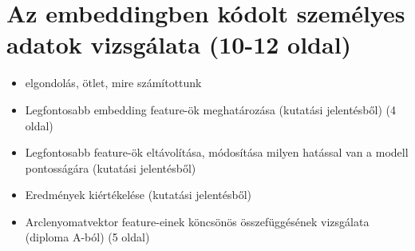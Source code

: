 \section{Az embeddingben kódolt személyes adatok vizsgálata (10-12 oldal)}
\label{sec:5}

\begin{itemize}
	\item elgondolás, ötlet, mire számítottunk
	\item Legfontosabb embedding feature-ök meghatározása (kutatási jelentésből) (4 oldal)
	\item Legfontosabb feature-ök eltávolítása, módosítása milyen hatással van a modell pontosságára (kutatási jelentésből) 
	\item Eredmények kiértékelése (kutatási jelentésből) 
	\item Arclenyomatvektor feature-einek köncsönös összefüggésének vizsgálata (diploma A-ból) (5 oldal)
\end{itemize}




